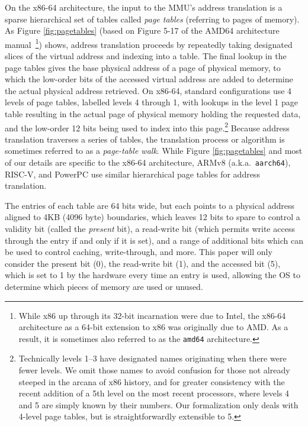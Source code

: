 \documentclass[acmsmall,screen,nonacm]{acmart}
\begin{document}
On the x86-64 architecture, the input to the \textsc{MMU}'s address translation is a sparse hierarchical set of tables 
called \emph{page tables} (referring to pages of memory). As Figure \ref{fig:pagetables} (based on Figure 5-17 of the 
AMD64 architecture manual~\cite{amd64_manual_vol2}\footnote{While x86 up through its 32-bit incarnation were due to Intel,
the x86-64 architecture as a 64-bit extension to x86 was originally due to AMD. As a result, it is sometimes also referred to as the \texttt{amd64} architecture.}) shows, 
address translation proceeds by repeatedly taking designated slices of the virtual address and indexing into a table.
The final lookup in the page tables gives the base physical address of a page of physical memory, to which the low-order
bits of the accessed virtual address are added to determine the actual physical address retrieved. 
On x86-64, standard configurations use 4 levels of page tables, labelled levels 4 through 1, with lookups in the level 
1 page table resulting in the actual page of physical memory holding the requested data, and the low-order 12 bits 
being used to index into this page.\footnote{Technically levels 1--3 have designated names originating when there were 
fewer levels. We omit those names to avoid confusion for those not already steeped in the arcana of x86 history,
 and for greater consistency with the recent addition of a 5th level 
on the most recent processors, where levels 4 and 5 are simply known by their numbers. Our formalization
only deals with 4-level page tables, but is straightforwardly extensible to 5.}  
Because address translation 
traverses a series of tables, the translation process or algorithm is sometimes referred to as a \emph{page-table walk}. 
While Figure \ref{fig:pagetables} and most of our details are specific to the x86-64 architecture, ARMv8 (a.k.a.\ 
\texttt{aarch64}), RISC-V, and PowerPC use similar hierarchical page tables for address translation.

The entries of each table are 64 bits wide, but each points to a physical address aligned to 4KB (4096 byte) boundaries, which leaves 12 bits to spare to control a validity bit (called the \emph{present} bit), a read-write bit (which permits write access through the entry if and only if it is set), and a range of additional bits which can be used to control caching, write-through, and more. This paper will only consider the present bit (0), the read-write bit (1), and the accessed bit (5), which is set to 1 by the hardware every time an entry is used, allowing the OS to determine which pieces of memory are used or unused.
\end{document}
